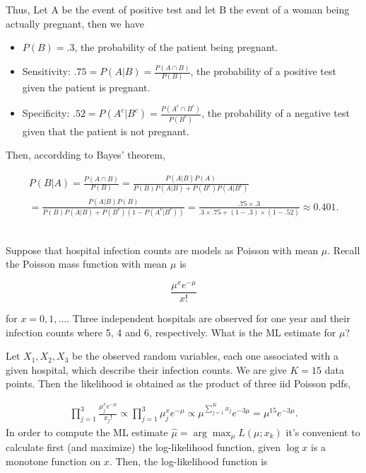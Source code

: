 \documentclass{homework}
\begin{document}
Thus, Let A be the event of positive test and let B the event of a woman being actually pregnant, then we have

\begin{itemize}
    \item $P(B) = .3$, the probability of the patient being pregnant. 
    \item Sensitivity: $.75 = P(A|B) = \frac{P(A\cap B)}{P(B)}$, the probability of a positive test given the patient is pregnant.
    \item Specificity: $.52 = P(A^c | B^c) = \frac{P(A^c\cap B^c)}{P(B^c)}$, the probability of a negative test given that the patient is not pregnant. 
\end{itemize}

Then, accordding to Bayes' theorem, 

\begin{align*}
    P(B|A) = \frac{P(A \cap B)}{P(B)} = \frac{P(A|B) P(A)}{P(B)P(A|B)+P(B^c)P(A|B^c)} \\
    = \frac{P(A|B)P(B)}{P(B)P(A|B)+P(B^c)(1-P(A^c|B^c))} = \frac{.75 \times .3}{.3 \times .75 + (1-.3)\times (1-.52)} \approx 0.401.
\end{align*}\\

\begin{tcolorbox}[title=Question 3]
Suppose that hospital infection counts are models as Poisson with mean $\mu$. Recall the Poisson mass function with mean $\mu$ is

$$ 
\frac{\mu^x e^{-\mu}}{x!} 
$$ 

for $x = 0,1,\ldots$. Three independent hospitals are observed for one year and their infection counts where 5, 4 and 6, respectively. What is the ML estimate for $\mu$?
\end{tcolorbox}

Let $X_1, X_2, X_3$ be the observed random variables, each one associated with a given hospital, which describe their infection counts. We are give $K=15$ data points. Then the likelihood is obtained as the product of three iid Poisson pdfs, 

\begin{align*}
    \prod_{j=1}^{3} \frac{\mu^x_j e^{-\mu}}{x_j!} \propto \prod_{j=1}^{3} {\mu^x_j e^{-\mu}} \propto \mu^{\sum_{j=1}^{K}x_j} e^{-3\mu} = \mu^{15}e^{-3\mu}. 
\end{align*}
In order to compute the ML estimate $\hat \mu = \arg \max_{\mu} L(\mu; x_k)$ it's convenient to calculate first (and maximize) the log-likelihood function, given $\log x$ is a monotone function on $x$. Then, the log-likelihood function is 
\end{document}
